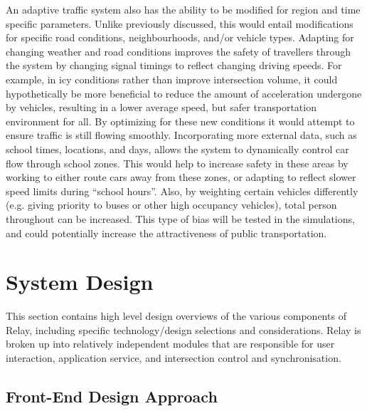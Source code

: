 \documentclass{article}
\begin{document}
An adaptive traffic system also has the ability to be modified for region and time specific parameters.
Unlike previously discussed, this would entail modifications for specific road conditions, neighbourhoods, and/or vehicle types.
Adapting for changing weather and road conditions improves the safety of travellers through the system by changing signal timings to reflect changing driving speeds.
For example, in icy conditions rather than improve intersection volume, it could hypothetically be more beneficial to reduce the amount of acceleration undergone by vehicles, resulting in a lower average speed, but safer transportation environment for all.
By optimizing for these new conditions it would attempt to ensure traffic is still flowing smoothly.
Incorporating more external data, such as school times, locations, and days, allows the system to dynamically control car flow through school zones.
This would help to increase safety in these areas by working to either route cars away from these zones, or adapting to reflect slower speed limits during ``school hours''.
Also, by weighting certain vehicles differently (e.g. giving priority to buses or other high occupancy vehicles), total person throughout can be increased.
This type of bias will be tested in the simulations, and could potentially increase the attractiveness of public transportation.

\newpage
\section{System Design}

This section contains high level design overviews of the various components of Relay, including specific technology/design selections and considerations.
Relay is broken up into relatively independent modules that are responsible for user interaction, application service, and intersection control and synchronisation.\\

\subsection{Front-End Design Approach}
\end{document}

